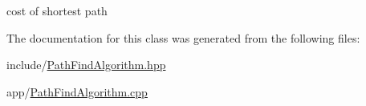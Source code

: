 cost of shortest path 



The documentation for this class was generated from the following files\-:\begin{DoxyCompactItemize}
\item 
include/\hyperlink{PathFindAlgorithm_8hpp}{Path\-Find\-Algorithm.\-hpp}\item 
app/\hyperlink{PathFindAlgorithm_8cpp}{Path\-Find\-Algorithm.\-cpp}\end{DoxyCompactItemize}
